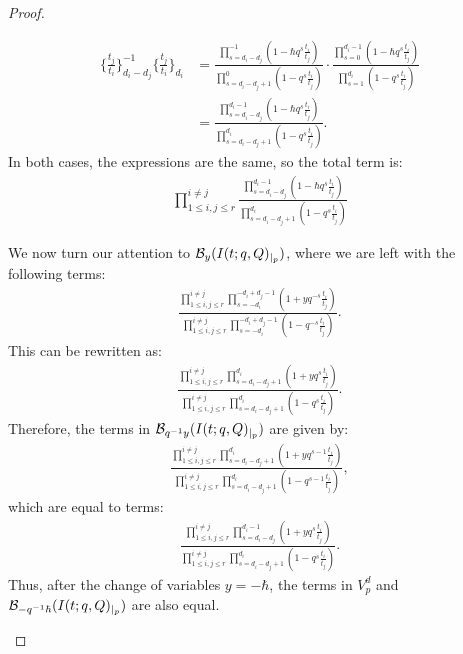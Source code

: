 \documentclass{amsart}
\begin{document}
\begin{proof}
\begin{itemize}
        \begin{align*}
            \{\frac{t_j}{t_i}\}_{d_i-d_j}^{-1}\{\frac{t_j}{t_i}\}_{d_i} &= \frac{\prod_{s=d_i-d_j}^{-1}(1-\hbar q^s  \frac{t_i}{t_j})}{\prod_{s=d_i-d_j+1}^0(1-q^s\frac{t_i}{t_j})} \cdot \frac{\prod_{s=0}^{d_i-1}(1- \hbar q^s \frac{t_i}{t_j})}{\prod_{s=1}^{d_i}(1-q^s\frac{t_i}{t_j})}  \\&= \frac{\prod_{s=d_i-d_j}^{d_i-1}(1-\hbar q^s  \frac{t_i}{t_j})}{\prod_{s=d_i-d_j+1}^{d_i}(1-q^s\frac{t_i}{t_j})}.
        \end{align*} 
       In both cases, the expressions are the same, so the total term is:
        \begin{align*}
            \prod_{1 \leq i,j \leq r}^{i \ne j}\frac{\prod_{s=d_i-d_j}^{d_i-1}(1-\hbar q^s \frac{t_i}{t_j})}{\prod_{s=d_i-d_j+1}^{d_i}(1-q^s\frac{t_i}{t_j})}
        \end{align*}
        
        We now turn our attention to $\mathcal{B}_{y}(I(t;q,Q)_{\arrowvert_{p}})$, where we are left with the following terms:
        \begin{align*}
        \frac{\prod_{1 \leq i,j \leq r}^{i \ne j}\prod_{s=-d_i}^{-d_i+d_j-1}(1+yq^{-s}\frac{t_i}{t_j})}{\prod_{1 \leq i,j \leq r}^{i \ne j}\prod_{s=-d_i}^{-d_i+d_j-1}(1-q^{-s}\frac{t_i}{t_j})}.
        \end{align*}
        This can be rewritten as:
        \begin{align*}
        \frac{\prod_{1 \leq i,j \leq r}^{i \ne j}\prod_{s=d_i-d_j+1}^{d_i}(1+yq^{s}\frac{t_i}{t_j})}{\prod_{1 \leq i,j \leq r}^{i \ne j}\prod_{s=d_i-d_j+1}^{d_i}(1-q^{s}\frac{t_i}{t_j})}.
        \end{align*}
        Therefore, the terms in $\mathcal{B}_{q^{-1}y}(I(t;q,Q)_{\arrowvert_{p}})$ are given by:
        \begin{align*}
        \frac{\prod_{1 \leq i,j \leq r}^{i \ne j}\prod_{s=d_i-d_j+1}^{d_i}(1+yq^{s-1}\frac{t_i}{t_j})}{\prod_{1 \leq i,j \leq r}^{i \ne j}\prod_{s=d_i-d_j+1}^{d_i}(1-q^{s-1}\frac{t_i}{t_j})},
        \end{align*}
            which are equal to terms:
            \begin{align*}
                \frac{\prod_{1 \leq i,j \leq r}^{i \ne j}\prod_{s=d_i-d_j}^{d_i-1}(1+yq^{s}\frac{t_i}{t_j})}{\prod_{1 \leq i,j \leq r}^{i \ne j}\prod_{s=d_i-d_j+1}^{d_i}(1-q^{s}\frac{t_i}{t_j})}.
            \end{align*}
            Thus, after the change of variables $y=-\hbar$, the terms in $V_p^d$ and $\mathcal{B}_{-q^{-1}\hbar}(I(t;q,Q)_{\arrowvert_{p}})$ are also equal.
    \end{itemize}
    \end{proof}
\end{document}

